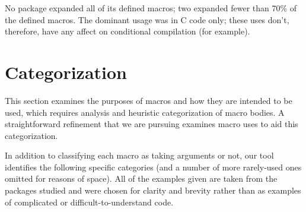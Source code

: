 \documentclass[11pt]{article}
\begin{document}
No package expanded all of its defined macros; two expanded fewer than 70\%
of the defined macros.  The dominant usage was in C code only; these uses
don't, therefore, have any affect on conditional compilation (for example).


\section{Categorization}
\label{sec:categorization}

This section examines the purposes of macros and how they are intended to
be used, which requires analysis and heuristic categorization of macro
bodies.  A straightforward refinement that we are pursuing examines macro
uses to aid this categorization.

In addition to classifying each macro as taking arguments or not, our tool
identifies the following specific categories (and a number of more
rarely-used ones omitted for reasons of space).  All of the examples given
are taken from the packages studied and were chosen for clarity and brevity
rather than as examples of complicated or difficult-to-understand code.
\end{document}
